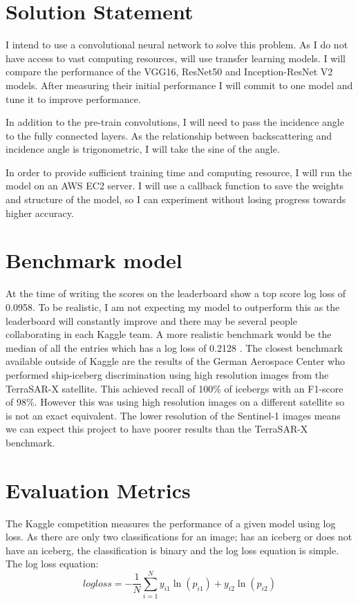 \documentclass{article}
\begin{document}
\section{Solution Statement}
I intend to use a convolutional neural network to solve this problem. As I do not have access to vast computing resources, will use transfer learning models. I will compare the performance of the VGG16, ResNet50 and Inception-ResNet V2 models. After measuring their initial performance I will commit to one model and tune it to improve performance. 

In addition to the pre-train convolutions, I will need to pass the incidence angle to the fully connected layers. As the relationship between backscattering and incidence angle is trigonometric, I will take the sine of the angle. 

In order to provide sufficient training time and computing resource, I will run the model on an AWS EC2 server. I will use a callback function to save the weights and structure of the model, so I can experiment without losing progress towards higher accuracy.

\section{Benchmark model}
At the time of writing the scores on the leaderboard show a top score log loss of 0.0958. To be realistic, I am not expecting my model to outperform this as the leaderboard will constantly improve and there may be several people collaborating in each Kaggle team. A more realistic benchmark would be the median of all the entries which has a log loss of 0.2128 \cite{kaggle}.
The closest benchmark available outside of Kaggle are the results of the German Aerospace Center \cite{bentes} who performed ship-iceberg discrimination using high resolution images from the TerraSAR-X satellite. This achieved recall of 100\% of icebergs with an F1-score of 98\%. However this was using high resolution images on a different satellite so is not an exact equivalent. The lower resolution of the Sentinel-1 images means we can expect this project to have poorer results than the TerraSAR-X benchmark. 

\section{Evaluation Metrics}
The Kaggle competition measures the performance of a given model using log loss. As there are only two classifications for an image; has an iceberg or does not have an iceberg, the classification is binary and the log loss equation is simple. The log loss equation: \cite{logloss}
\[ log loss = - \frac{1}{N} \sum_{i=1}^{N} y_{i1}\ln(p_{i1}) + y_{i2}\ln(p_{i2}) \]
\end{document}
